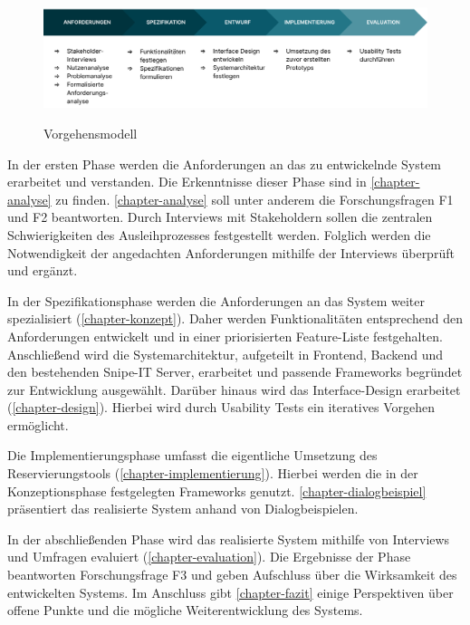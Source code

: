 \begin{figure}[h]
  \centering
  \includegraphics[scale=0.156]{Bilder/Screenshot 2022-10-17 at 18-39-40 Vorgehensmodell.pptx.png}
  \label{fig:schablone}
  \caption[Vorgehensmodell]{Vorgehensmodell}
\end{figure}

In der ersten Phase werden die Anforderungen an das zu entwickelnde System erarbeitet und
verstanden. Die Erkenntnisse dieser Phase sind in \ref{chapter-analyse} zu finden.
\ref{chapter-analyse} soll unter anderem die Forschungsfragen F1 und F2 beantworten. Durch
Interviews mit Stakeholdern sollen die zentralen Schwierigkeiten des Ausleihprozesses
festgestellt werden. Folglich werden die Notwendigkeit der angedachten Anforderungen mithilfe der
Interviews überprüft und ergänzt.

In der Spezifikationsphase werden die Anforderungen an das System weiter spezialisiert
(\ref{chapter-konzept}). Daher werden Funktionalitäten entsprechend den Anforderungen entwickelt und
in einer priorisierten Feature-Liste festgehalten. Anschließend wird die Systemarchitektur,
aufgeteilt in Frontend, Backend und den bestehenden Snipe-IT Server, erarbeitet und passende
Frameworks begründet zur Entwicklung ausgewählt. Darüber hinaus wird das Interface-Design
erarbeitet (\ref{chapter-design}). Hierbei wird durch Usability Tests ein iteratives Vorgehen
ermöglicht.

Die Implementierungsphase umfasst die eigentliche Umsetzung des Reservierungstools
(\ref{chapter-implementierung}). Hierbei werden die in der Konzeptionsphase festgelegten Frameworks
genutzt. \ref{chapter-dialogbeispiel} präsentiert das realisierte System anhand von
Dialogbeispielen.

In der abschließenden Phase wird das realisierte System mithilfe von Interviews und Umfragen
evaluiert (\ref{chapter-evaluation}). Die Ergebnisse der Phase beantworten Forschungsfrage F3 und
geben Aufschluss über die Wirksamkeit des entwickelten Systems. Im Anschluss gibt
\ref{chapter-fazit} einige Perspektiven über offene Punkte und die mögliche Weiterentwicklung des
Systems.
